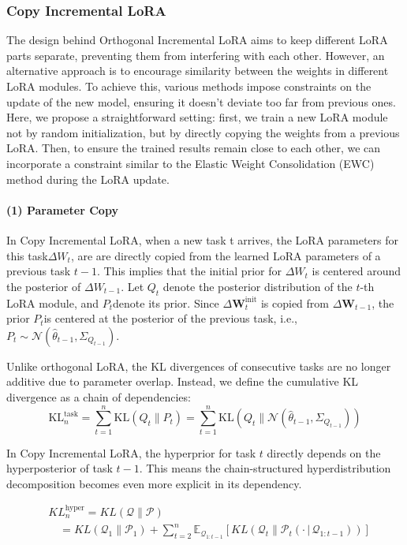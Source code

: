 \documentclass[letterpaper]{article} %
\begin{document}
\subsubsection{Copy Incremental LoRA}
The design behind Orthogonal Incremental LoRA aims to keep different LoRA parts separate, preventing them from interfering with each other. However, an alternative approach is to encourage similarity between the weights in different LoRA modules. To achieve this, various methods impose constraints on the update of the new model, ensuring it doesn't deviate too far from previous ones. Here, we propose a straightforward setting: first, we train a new LoRA module not by random initialization, but by directly copying the weights from a previous LoRA. Then, to ensure the trained results remain close to each other, we can incorporate a constraint similar to the Elastic Weight Consolidation (EWC) method during the LoRA update.
\paragraph{(1) Parameter Copy }

In Copy Incremental LoRA, when a new task t arrives, the LoRA parameters for this task$\Delta W_t$, are are directly copied from the learned LoRA parameters of a previous task $t-1$. This implies that the initial prior for $\Delta W_t$ is centered around the posterior of $\Delta W_{t-1}$.  Let $Q_t $ denote the posterior distribution of the $t$-th LoRA module, and $P_t $denote its prior. Since $\Delta\mathbf{W}_t^{\text{init}} $ is copied from $\Delta\mathbf{W}_{t-1} $, the prior $P_t $is centered at the posterior of the previous task, i.e., $P_t \sim \mathcal{N}(\hat{\theta}_{t-1}, \Sigma_{Q_{t-1}}) $.

Unlike orthogonal LoRA, the KL divergences of consecutive tasks are no longer additive due to parameter overlap. Instead, we define the cumulative KL divergence as a chain of dependencies:
 $$ \text{KL}_n^{\text{task}} = \sum_{t=1}^n \text{KL}(Q_t \| P_t) = \sum_{t=1}^n \text{KL}(Q_t \| \mathcal{N}(\hat{\theta}_{t-1}, \Sigma_{Q_{t-1}}))  $$



In Copy Incremental LoRA, the hyperprior for task $t$ directly depends on the hyperposterior of task $t-1$. This means the chain-structured hyperdistribution decomposition becomes even more explicit in its dependency. 


$$  
\begin{aligned}
    &KL^{\text{hyper}}_n = KL(\mathcal{Q} \| \mathcal{P})  \\
    & \quad =KL(\mathcal{Q}_1 \| \mathcal{P}_1)  +\sum_{t=2}^n \mathbb{E}_{\mathcal{Q}_{1:t-1}}\left[        KL(\mathcal{Q}_t \| \mathcal{P}_t(\cdot\,|\,\mathcal{Q}_{1:t-1}))    \right]
\end{aligned}
$$
\end{document}

